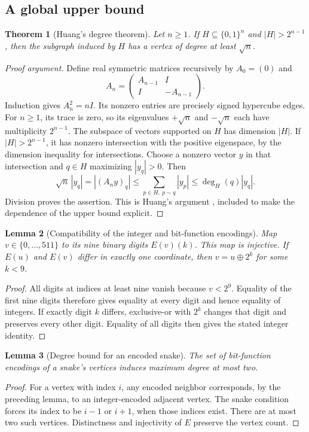\documentclass[11pt,a4paper]{article}
\newtheorem{theorem}{Theorem}[section]
\newtheorem{lemma}[theorem]{Lemma}
\theoremstyle{definition}
\theoremstyle{remark}
\begin{document}
\subsection{A global upper bound}
\begin{theorem}[Huang's degree theorem]\label{thm:huang}
Let $n\ge1$. If $H\subseteq\{0,1\}^n$ and $|H|>2^{n-1}$, then the subgraph induced by $H$ has a vertex of degree at least $\sqrt n$.
\end{theorem}
\begin{proof}[Proof argument]
Define real symmetric matrices recursively by $A_0=(0)$ and
\[
A_n=\begin{pmatrix}A_{n-1}&I\\I&-A_{n-1}\end{pmatrix}.
\]
Induction gives $A_n^2=nI$. Its nonzero entries are precisely signed hypercube edges. For $n\ge1$, its trace is zero, so its eigenvalues $+\sqrt n$ and $-\sqrt n$ each have multiplicity $2^{n-1}$. The subspace of vectors supported on $H$ has dimension $|H|$. If $|H|>2^{n-1}$, it has nonzero intersection with the positive eigenspace, by the dimension inequality for intersections. Choose a nonzero vector $y$ in that intersection and $q\in H$ maximizing $|y_q|>0$. Then
\[
\sqrt n\,|y_q|=|(A_ny)_q|
\le\sum_{p\in H,\ p\sim q}|y_p|
\le \deg_H(q)|y_q|.
\]
Division proves the assertion. This is Huang's argument \cite{huang}, included to make the dependence of the upper bound explicit.
\end{proof}

\begin{lemma}[Compatibility of the integer and bit-function encodings]
Map $v\in\{0,\ldots,511\}$ to its nine binary digits $E(v)(k)$. This map is injective. If $E(u)$ and $E(v)$ differ in exactly one coordinate, then $v=u\oplus2^k$ for some $k<9$.
\end{lemma}
\begin{proof}
All digits at indices at least nine vanish because $v<2^9$. Equality of the first nine digits therefore gives equality at every digit and hence equality of integers. If exactly digit $k$ differs, exclusive-or with $2^k$ changes that digit and preserves every other digit. Equality of all digits then gives the stated integer identity.
\end{proof}

\begin{lemma}[Degree bound for an encoded snake]
The set of bit-function encodings of a snake's vertices induces maximum degree at most two.
\end{lemma}
\begin{proof}
For a vertex with index $i$, any encoded neighbor corresponds, by the preceding lemma, to an integer-encoded adjacent vertex. The snake condition forces its index to be $i-1$ or $i+1$, when those indices exist. There are at most two such vertices. Distinctness and injectivity of $E$ preserve the vertex count.
\end{proof}
\end{document}
